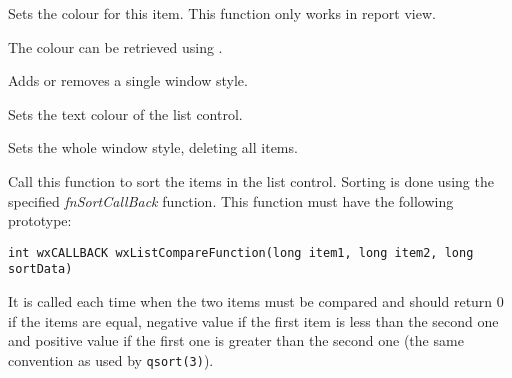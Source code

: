 
Sets the colour for this item. This function only works in report view.

The colour can be retrieved using
.


\label{wxlistctrlsetsinglestyle}


Adds or removes a single window style.


\label{wxlistctrlsettextcolour}


Sets the text colour of the list control.


\label{wxlistctrlsetwindowstyleflag}


Sets the whole window style, deleting all items.

\label{wxlistctrlsortitems}


Call this function to sort the items in the list control. Sorting is done
using the specified {\it fnSortCallBack} function. This function must have the
following prototype:

\begin{verbatim}
int wxCALLBACK wxListCompareFunction(long item1, long item2, long sortData)
\end{verbatim}

It is called each time when the two items must be compared and should return 0
if the items are equal, negative value if the first item is less than the
second one and positive value if the first one is greater than the second one
(the same convention as used by {\tt qsort(3)}).




